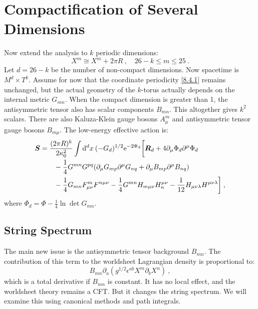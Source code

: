 \section{\texorpdfstring{Compactification of Several Dimensions}{8.4 Compactification of Several Dimensions}} \label{sec:8.4}
Now extend the analysis to $k$ periodic dimensions:
\begin{equation}
	X^{m} \cong X^{m}+2 \pi R \:, \quad 26-k \leq m \leq  25 \:. \label{8.4.1}
\end{equation}
Let $d=26-k$ be the number of non-compact dimensions. Now spacetime is $M^{d} \times T^{k}$. Assume for now that the coordinate periodicity \eqref{8.4.1} remains unchanged, but the actual geometry of the $k$-torus actually depends on the internal metric $G_{m n}$. When the compact dimension is greater than 1, the antisymmetric tensor also has scalar components $B_{m n}$. This altogether gives $k^{2}$ scalars. 
There are also Kaluza-Klein gauge bosons $A_{\mu}^{m}$ and antisymmetric tensor gauge bosons $B_{m \mu}$. The low-energy effective action is:
\begin{align}
	\bm{S} &= \frac{(2 \pi R)^{k}}{2 \kappa_{0}^{2}} \int \mathrm{d}^{d} x \: (-G_{d})^{1/2} \mathrm{e}^{-2 \Phi_{d}}
	\biggl[\bm{R}_{d}+4 \partial_{\mu} \Phi_{d} \partial^{\mu} \Phi_{d} \nonumber \\
	&\qquad -\frac{1}{4} G^{m n} G^{p q} (\partial_{\mu} G_{m p} \partial^{\mu} G_{n q}+\partial_{\mu} B_{m p} \partial^{\mu} B_{n q})  \nonumber \\
	&\qquad -\frac{1}{4} G_{m n} F_{\mu \nu}^{m} F^{n \mu \nu}-\frac{1}{4} G^{m n} H_{m \mu \nu} H_{n}^{\mu \nu}
	-\frac{1}{12} H_{\mu \nu \lambda} H^{\mu \nu \lambda}\biggr] \:, \label{8.4.2}
\end{align}
where $\Phi_{d}=\Phi-\frac{1}{4} \ln \operatorname{det} G_{m n}$.

\subsection*{String Spectrum}
The main new issue is the antisymmetric tensor background $B_{mn}$. The contribution of this term to the worldsheet Lagrangian density is proportional to:
\begin{equation}
	B_{m n} \partial_{a}(g^{1 / 2} \epsilon^{a b} X^{m} \partial_{b} X^{n}) \:, \label{8.4.3}
\end{equation}
which is a total derivative if $B_{m n}$ is constant. It has no local effect, and the worldsheet theory remains a CFT. 
But it changes the string spectrum. We will examine this using canonical methods and path integrals.

